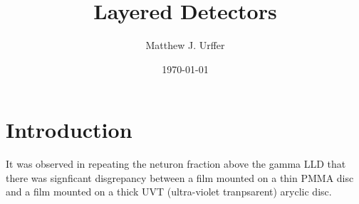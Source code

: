 \documentclass[draftcls,onecolumn]{IEEEtran}
\begin{document}
\title{Layered Detectors}
\author{Matthew J. Urffer}
\date{\today}
\maketitle


\listoftodos
\tableofcontents
\listoffigures
\listoftables
\lstlistoflistings
\section{Introduction}
It was observed in repeating the neturon fraction above the gamma LLD that there was signficant disgrepancy between a film mounted on a thin PMMA disc and a film mounted on a thick UVT (ultra-violet tranpsarent) aryclic disc.
\end{document}
